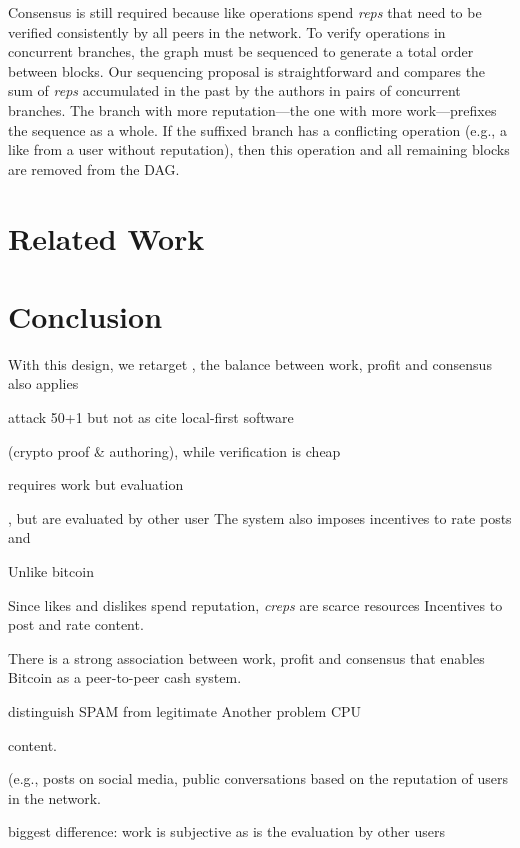 \documentclass[10pt,journal,compsoc]{IEEEtran}
\begin{document}
Consensus is still required because like operations spend \emph{reps} that need
to be verified consistently by all peers in the network.
To verify operations in concurrent branches, the graph must be sequenced to
generate a total order between blocks.
Our sequencing proposal is straightforward and compares the sum of \emph{reps}
accumulated in the past by the authors in pairs of concurrent branches.
The branch with more reputation---the one with more work---prefixes the
sequence as a whole.
If the suffixed branch has a conflicting operation (e.g., a like from a user
without reputation), then this operation and all remaining blocks are removed
from the DAG.

\section{Related Work}
\label{sec.related}

\section{Conclusion}
\label{sec.conclusion}



With this design, we retarget  , the balance between work, profit and consensus also applies 

attack 50+1 but not as
cite local-first software

 (crypto proof \& authoring),
while verification is cheap


requires work but evaluation


, but
are evaluated by other user
The system also imposes incentives to rate posts and 

Unlike bitcoin

Since likes and dislikes spend reputation, \emph{creps} are scarce resources
Incentives to post and rate content.

There is a strong association between work, profit and consensus that enables
Bitcoin as a peer-to-peer cash system.

distinguish SPAM from legitimate
Another problem CPU



content.



 (e.g., posts on social media, public conversations
based on the reputation of users
in the network.


biggest difference:
work is subjective as is the evaluation by other users
\end{document}
